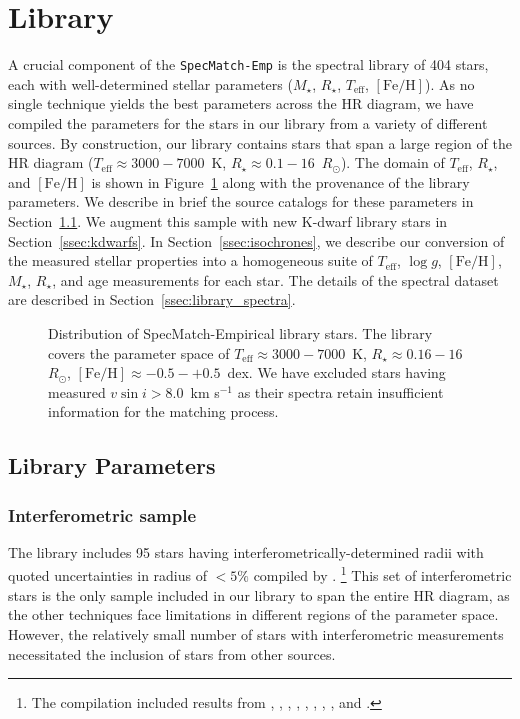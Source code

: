 \documentclass[preprint2]{aastex6}
\newcommand{\SpecMatch}{\texttt{SpecMatch-Emp}\xspace}
\newcommand{\Mstar}{\ensuremath{M_{\star}}\xspace}
\newcommand{\Rstar}{\ensuremath{R_{\star}}\xspace}
\newcommand{\fe}{\ensuremath{\mathrm{[Fe/H]}}\xspace}
\newcommand{\teff}{\ensuremath{T_{\mathrm{eff}}}\xspace}
\newcommand{\logg}{\ensuremath{\log g}\xspace}
\newcommand{\vsini}{\ensuremath{v \sin i}\xspace}
\newcommand{\kms}{km s$^{-1}$\xspace}
\newcommand{\Rsun}{\ensuremath{R_{\odot}}\xspace }
\newcommand{\libnum}{404\xspace}
\newcommand{\vonbraunnum}{95\xspace}
\newcommand{\libtefflo}{3000\xspace}
\newcommand{\libteffhi}{7000\xspace}
\newcommand{\libRstarlo}{0.1\xspace}
\newcommand{\libRstarhi}{16\xspace}
\begin{document}
\section{Library} \label{sec:library}
A crucial component of the \SpecMatch is the spectral library of \libnum stars, each with well-determined stellar parameters (\Mstar, \Rstar, \teff, \fe). As no single technique yields the best parameters across the HR diagram, we have compiled the parameters for the stars in our library from a variety of different sources. By construction, our library contains stars that span a large region of the HR diagram ($\teff\approx\libtefflo-\libteffhi$~K, $\Rstar\approx\libRstarlo-\libRstarhi$~\Rsun). The domain of \teff, \Rstar, and \fe is shown in Figure~\ref{fig:library} along with the provenance of the library parameters. We describe in brief the source catalogs for these parameters in Section~\ref{sec:library_params}. We augment this sample with new K-dwarf library stars in Section~\ref{ssec:kdwarfs}. In Section~\ref{ssec:isochrones}, we describe our conversion of the measured stellar properties into a homogeneous suite of \teff, \logg, \fe, \Mstar, \Rstar, and age measurements for each star. The details of the spectral dataset are described in Section~\ref{ssec:library_spectra}.

\begin{figure}
	\caption{Distribution of SpecMatch-Empirical library stars. The library covers the parameter space of $\teff \approx 3000-7000$~K, $\Rstar \approx 0.16-16$~\Rsun, $\fe \approx -0.5-+0.5$~dex. We have excluded stars having measured $\vsini > 8.0$~\kms as their spectra retain insufficient information for the matching process. \label{fig:library}}
\end{figure}

\subsection{Library Parameters} \label{sec:library_params}

\subsubsection{Interferometric sample} \label{sec:sample_interferometric}
The library includes \vonbraunnum stars having interferometrically-determined radii with quoted uncertainties in radius of $< 5\%$ compiled by \cite{VonBraun14}.%
\footnote{
The \cite{VonBraun14} compilation included results from \cite{Kervella03}, \cite{Baines08}, \cite{Baines09}, \cite{VanBelle09}, \cite{VonBraun11a}, \cite{VonBraun11b}, \cite{VonBraun12}, \cite{Boyajian13}, and \cite{Henry13}.
}
%
This set of interferometric stars is the only sample included in our library to span the entire HR diagram, as the other techniques face limitations in different regions of the parameter space. However, the relatively small number of stars with interferometric measurements necessitated the inclusion of stars from other sources.
\end{document}
